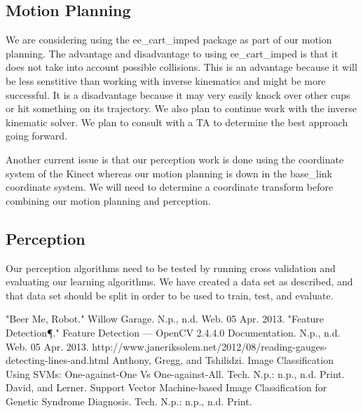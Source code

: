 \documentclass[letterpaper, 10 pt, conference]{ieeeconf}  %
\begin{document}
\subsection{Motion Planning}
We are considering using the ee\_cart\_imped package as part of our motion planning. The advantage and disadvantage to using ee\_cart\_imped is that it does not take into account possible collisions. This is an advantage because it will be less senstitive than working with inverse kinematics and might be more successful. It is a disadvantage because it may very easily knock over other cups or hit something on its trajectory. We also plan to continue work with the inverse kinematic solver. We plan to consult with a TA to determine the best approach going forward.

Another current issue is that our perception work is done using the coordinate system of the Kinect whereas our motion planning is down in the base\_link coordinate system. We will need to determine a coordinate transform before combining our motion planning and perception.

\subsection{Perception}
Our perception algorithms need to be tested by running cross validation and evaluating our learning algorithms. We have created a data set as described, and that data set should be split in order to be used to train, test, and evaluate.





\begin{thebibliography}{99}

 "Beer Me, Robot." Willow Garage. N.p., n.d. Web. 05 Apr. 2013.
 "Feature Detection¶." Feature Detection — OpenCV 2.4.4.0 Documentation. N.p., n.d. Web. 05 Apr. 2013.
 http://www.janeriksolem.net/2012/08/reading-gauges-detecting-lines-and.html
 Anthony, Gregg, and Tshilidzi. Image Classification Using SVMs: One-against-One Vs One-against-All. Tech. N.p.: n.p., n.d. Print.
 David, and Lerner. Support Vector Machine-based Image Classiﬁcation for Genetic Syndrome Diagnosis. Tech. N.p.: n.p., n.d. Print.







\end{thebibliography}
\end{document}
